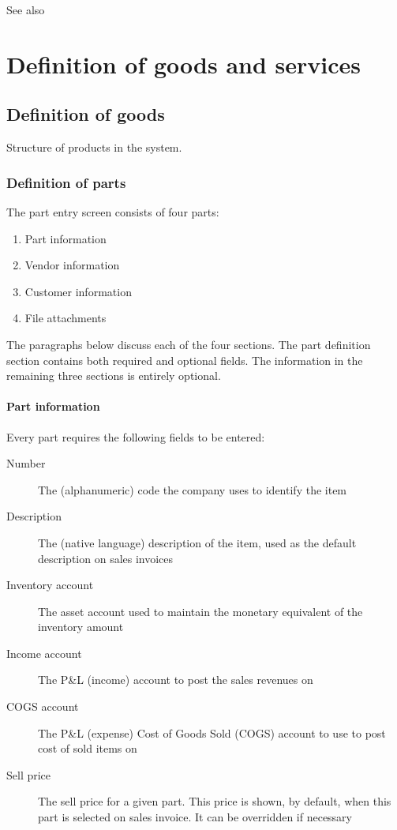 See also 

\chapter{Definition of goods and services}
\label{cha-products-definition}


\section{Definition of goods}
\label{sec-products-definition-goods}

Structure of products in the system.

\subsection{Definition of parts}
\label{subsec-products-parts-definition}

The part entry screen consists of four parts:

\begin{enumerate}
\item Part information
\item Vendor information
\item Customer information
\item File attachments
\end{enumerate}


The paragraphs below discuss each of the four sections. The part definition section
contains both required and optional fields. The information in the remaining
three sections is entirely optional.

\subsubsection{Part information}
\label{subsubsec-parts-information}

Every part requires the following fields to be entered:

\begin{description}
\item [Number] The (alphanumeric) code the company uses to identify the item
\item [Description] The (native language) description of the item, used as the default
        description on sales invoices
\item [Inventory account] The asset account used to maintain the monetary equivalent
        of the inventory amount
\item [Income account] The P\&L (income) account to post the sales revenues on
\item [COGS account] The P\&L (expense) Cost of Goods Sold (COGS) account to use
        to post cost of sold items on
\item [Sell price] The sell price for a given part. This price is shown, by default, when this part is selected on sales invoice.  It can be overridden if necessary
\end{description}


